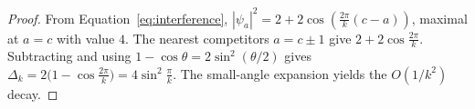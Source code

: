 \begin{proof}
From Equation~\eqref{eq:interference}, $|\psi_a|^2=2+2\cos(\tfrac{2\pi}{k}(c-a))$, maximal at $a=c$
with value $4$. The nearest competitors $a=c\pm1$ give $2+2\cos\tfrac{2\pi}{k}$. Subtracting and
using $1-\cos\theta=2\sin^2(\theta/2)$ gives
$\Delta_k=2\big(1-\cos\tfrac{2\pi}{k}\big)=4\sin^2\tfrac{\pi}{k}$. The small-angle expansion yields
the $O(1/k^2)$ decay.
\end{proof}

\FloatBarrier
